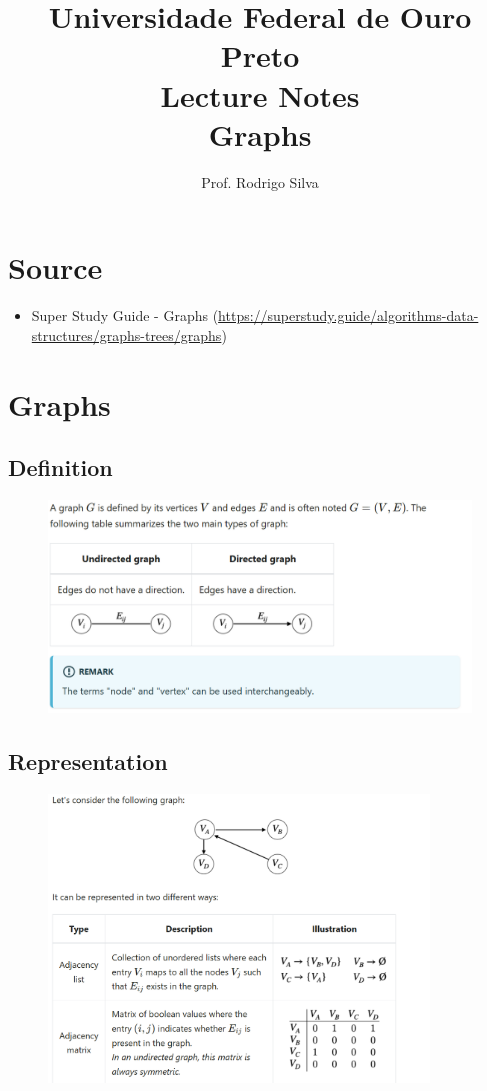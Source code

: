 \documentclass{article}
\title{\vspace{-2 cm}Universidade Federal de Ouro Preto \\ Lecture Notes \\ Graphs}
\author{Prof. Rodrigo Silva}
\begin{document}
\maketitle

\section*{Source}

\begin{itemize}
    \item Super Study Guide - Graphs (\url{https://superstudy.guide/algorithms-data-structures/graphs-trees/graphs})
\end{itemize}

\section{Graphs}

\subsection{Definition}
\begin{figure}[!ht]
    \centering
    \includegraphics*[width=1\textwidth]{graph.png}
\end{figure}

\pagebreak
\subsection{Representation}
\begin{figure}[!ht]
    \centering
    \includegraphics*[width=0.9\textwidth]{graph_representation.png}
\end{figure}
\end{document}
